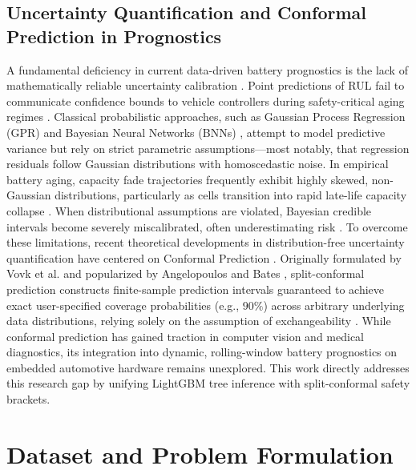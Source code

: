 \documentclass[pdflatex,sn-mathphys-num]{sn-jnl}%
\theoremstyle{thmstyleone}%
\theoremstyle{thmstyletwo}%
\theoremstyle{thmstylethree}%
\begin{document}
\subsection{Uncertainty Quantification and Conformal Prediction in Prognostics}\label{subsec:uq_conformal}
A fundamental deficiency in current data-driven battery prognostics is the lack of mathematically reliable uncertainty calibration \cite{berecibar2016online,angelopoulos2021gentle}. Point predictions of RUL fail to communicate confidence bounds to vehicle controllers during safety-critical aging regimes \cite{vovk2005algorithmic}. Classical probabilistic approaches, such as Gaussian Process Regression (GPR) \cite{richardson2018gaussian} and Bayesian Neural Networks (BNNs) \cite{peng2019integrated}, attempt to model predictive variance but rely on strict parametric assumptions---most notably, that regression residuals follow Gaussian distributions with homoscedastic noise. In empirical battery aging, capacity fade trajectories frequently exhibit highly skewed, non-Gaussian distributions, particularly as cells transition into rapid late-life capacity collapse \cite{shafer2008tutorial}. When distributional assumptions are violated, Bayesian credible intervals become severely miscalibrated, often underestimating risk \cite{barber2023predictive}. To overcome these limitations, recent theoretical developments in distribution-free uncertainty quantification have centered on Conformal Prediction \cite{angelopoulos2021gentle,romano2019conformalized}. Originally formulated by Vovk et al. \cite{vovk2005algorithmic} and popularized by Angelopoulos and Bates \cite{angelopoulos2021gentle}, split-conformal prediction constructs finite-sample prediction intervals guaranteed to achieve exact user-specified coverage probabilities (e.g., $90\%$) across arbitrary underlying data distributions, relying solely on the assumption of exchangeability \cite{papadopoulos2002inductive,angelopoulos2021uncertainty}. While conformal prediction has gained traction in computer vision and medical diagnostics, its integration into dynamic, rolling-window battery prognostics on embedded automotive hardware remains unexplored. This work directly addresses this research gap by unifying LightGBM tree inference with split-conformal safety brackets.

\section{Dataset and Problem Formulation}\label{sec3}
\end{document}
